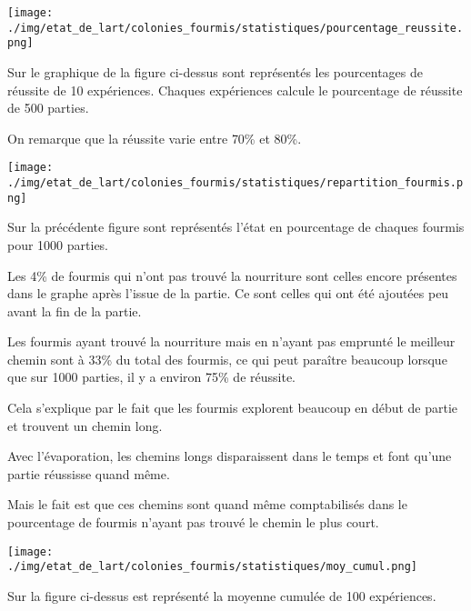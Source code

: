 \documentclass[
12pt,
french,
]{article}
\let\origfigure\figure
\let\endorigfigure\endfigure
\renewenvironment{figure}[1][2] {
  \expandafter\origfigure\expandafter[H]
} {
  \endorigfigure
}
\begin{document}
\begin{figure}
\centering
\texttt{[image: ./img/etat\_de\_lart/colonies\_fourmis/statistiques/pourcentage\_reussite.png]}
\caption{Graphique représentant le pourcentage de réussite de 10
expériences}
\end{figure}

Sur le graphique de la figure ci-dessus sont représentés les
pourcentages de réussite de 10 expériences. Chaques expériences calcule
le pourcentage de réussite de 500 parties.

On remarque que la réussite varie entre 70\% et 80\%.

\begin{figure}
\centering
\texttt{[image: ./img/etat\_de\_lart/colonies\_fourmis/statistiques/repartition\_fourmis.png]}
\caption{Graphique de répartition en moyenne des fourmis sur 1000
parties}
\end{figure}

Sur la précédente figure sont représentés l'état en pourcentage de
chaques fourmis pour 1000 parties.

Les 4\% de fourmis qui n'ont pas trouvé la nourriture sont celles encore
présentes dans le graphe après l'issue de la partie. Ce sont celles qui
ont été ajoutées peu avant la fin de la partie.

Les fourmis ayant trouvé la nourriture mais en n'ayant pas emprunté le
meilleur chemin sont à 33\% du total des fourmis, ce qui peut paraître
beaucoup lorsque que sur 1000 parties, il y a environ 75\% de réussite.

Cela s'explique par le fait que les fourmis explorent beaucoup en début
de partie et trouvent un chemin long.

Avec l'évaporation, les chemins longs disparaissent dans le temps et
font qu'une partie réussisse quand même.

Mais le fait est que ces chemins sont quand même comptabilisés dans le
pourcentage de fourmis n'ayant pas trouvé le chemin le plus court.

\begin{figure}
\centering
\texttt{[image: ./img/etat\_de\_lart/colonies\_fourmis/statistiques/moy\_cumul.png]}
\caption{Moyenne cumulée de 100 expériences}
\end{figure}

Sur la figure ci-dessus est représenté la moyenne cumulée de 100
expériences.
\end{document}
